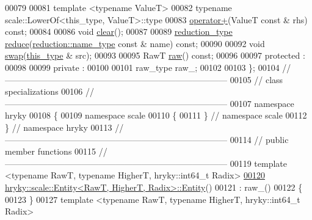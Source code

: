 \begin{DoxyCode}
00079 
00081     \textcolor{keyword}{template} <\textcolor{keyword}{typename} ValueT>
00082     \textcolor{keyword}{typename} scale::LowerOf<this\_type, ValueT>::type
00083         \hyperlink{classhryky_1_1scale_1_1_entity_a0e711f3283eab1061dc77c94bcb13ccf}{operator+}(ValueT \textcolor{keyword}{const} & rhs) \textcolor{keyword}{const};
00084 
00086     \textcolor{keywordtype}{void} \hyperlink{classhryky_1_1scale_1_1_entity_ae0d0dd27d319afcc138de2c4dd733370}{clear}();
00087 
00089     \hyperlink{classhryky_1_1_intrusive_ptr}{reduction_type} \hyperlink{classhryky_1_1scale_1_1_entity_aa745d5ef4401aa7f06ba72b91d06a3df}{reduce}(\hyperlink{classhryky_1_1reduction_1_1_string}{reduction::name_type} \textcolor{keyword}{const} & name) \textcolor{keyword}{const};
00090 
00092     \textcolor{keywordtype}{void} \hyperlink{classhryky_1_1scale_1_1_entity_a8ec8cc49ba0fd7e19cfe2ed714d62663}{swap}(\hyperlink{classhryky_1_1scale_1_1_entity}{this_type} & src);
00093 
00095     RawT \hyperlink{classhryky_1_1scale_1_1_entity_ac9d555edcbc0d8f8369f386a7b4d4d0f}{raw}() \textcolor{keyword}{const};
00096 
00097 \textcolor{keyword}{protected} :
00098 
00099 \textcolor{keyword}{private} :
00100 
00101     raw\_type raw\_;
00102 
00103 \};
00104 \textcolor{comment}{//
      ------------------------------------------------------------------------------}
00105 \textcolor{comment}{// class specializations}
00106 \textcolor{comment}{//
      ------------------------------------------------------------------------------}
00107 \textcolor{keyword}{namespace }hryky
00108 \{
00109 \textcolor{keyword}{namespace }scale
00110 \{
00111 \} \textcolor{comment}{// namespace scale}
00112 \} \textcolor{comment}{// namespace hryky}
00113 \textcolor{comment}{//
      ------------------------------------------------------------------------------}
00114 \textcolor{comment}{// public member functions}
00115 \textcolor{comment}{//
      ------------------------------------------------------------------------------}
00119 \textcolor{comment}{}\textcolor{keyword}{template} <\textcolor{keyword}{typename} RawT, \textcolor{keyword}{typename} HigherT, hryky::\textcolor{keywordtype}{int}64\_t Radix>
\hypertarget{scale__entity_8h_source_l00120}{}\hyperlink{classhryky_1_1scale_1_1_entity_aa350dc64a99ba08a1dbc8ac40e18d97e}{00120} \hyperlink{classhryky_1_1scale_1_1_entity_aa350dc64a99ba08a1dbc8ac40e18d97e}{hryky::scale::Entity<RawT, HigherT, Radix>::Entity}()
00121     : raw\_()
00122 \{
00123 \}
00127 \textcolor{keyword}{template} <\textcolor{keyword}{typename} RawT, \textcolor{keyword}{typename} HigherT, hryky::\textcolor{keywordtype}{int}64\_t Radix>

\end{DoxyCode}
